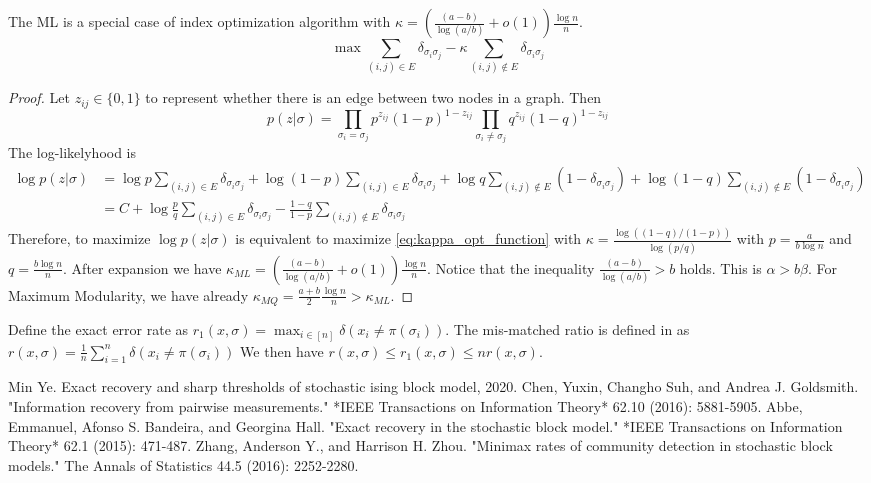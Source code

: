 \documentclass{article}
\begin{document}
\begin{proposition}
	The ML is a special case of index optimization algorithm with
	$\kappa = (\frac{(a - b)}{\log(a/b)} + o(1))\frac{\log n}{n}$.
	\begin{equation}\label{eq:kappa_opt_function}
	\max \sum_{(i,j) \in E} \delta_{\sigma_i\sigma_j} - \kappa \sum_{(i,j) \not\in E}  \delta_{\sigma_i\sigma_j} 
	\end{equation}
\end{proposition}
\begin{proof}
	Let $z_{ij} \in \{0, 1\}$ to represent whether there is an edge between two nodes in a graph. Then
	$$
	p(z | \sigma) = \prod_{\sigma_i = \sigma_j} p^{z_{ij}}
		(1-p)^{1-z_{ij}} \prod_{\sigma_i \neq \sigma_j} q^{z_{ij}}(1-q)^{1-z_{ij}}
	$$
	The log-likelyhood is
	\begin{align}
	\log p(z | \sigma) &= \log p \sum_{(i,j) \in E} \delta_{\sigma_i\sigma_j}
	+ \log(1-p) \sum_{(i,j)\in E} \delta_{\sigma_i\sigma_j} 
	+ \log q \sum_{(i,j) \not\in E} (1-\delta_{\sigma_i\sigma_j})
	+\log (1-q) \sum_{(i,j) \not\in E} (1-\delta_{\sigma_i\sigma_j}) \\
	& =C + \log\frac{p}{q} \sum_{(i,j) \in E} \delta_{\sigma_i\sigma_j}
	-\frac{1-q}{1-p}\sum_{(i,j) \not\in E} \delta_{\sigma_i\sigma_j}
	\end{align}
	Therefore, to maximize $\log p (z | \sigma)$ is equivalent to maximize \eqref{eq:kappa_opt_function}
	with $\kappa = \frac{\log((1-q)/(1-p))}{\log (p / q)}$ with $p=\frac{a}{b\log n}$ and
	$q = \frac{b\log n}{n}$. After expansion we have $\kappa_{ML} = (\frac{(a - b)}{\log(a/b)} + o(1))\frac{\log n}{n}$.
	Notice that the inequality
	$ \frac{(a - b)}{\log(a/b)}  > b$ holds. This is $\alpha > b \beta$.
	For Maximum Modularity, we have already $\kappa_{MQ} = \frac{a+b}{2}\frac{\log n}{n} > \kappa_{ML}$.
\end{proof}
\begin{proposition}
	Define the exact error rate as
	$r_1(x, \sigma) = \max_{i\in [n]} \delta(x_i \neq \pi(\sigma_i))$.
	The mis-matched ratio is defined in \cite{zhang} as
	$ r(x, \sigma) = \frac{1}{n} \sum_{i=1}^n \delta(x_i \neq \pi(\sigma_i))$
	We then have $ r(x, \sigma) \leq r_1(x, \sigma) \leq n r(x, \sigma)$.
\end{proposition}
\begin{thebibliography}{1}
	

	Min Ye.
	\newblock Exact recovery and sharp thresholds of stochastic ising block model,
	2020.
	Chen, Yuxin, Changho Suh, and Andrea J. Goldsmith. "Information recovery from pairwise measurements." *IEEE Transactions on Information Theory* 62.10 (2016): 5881-5905.
	Abbe, Emmanuel, Afonso S. Bandeira, and Georgina Hall. "Exact recovery in the stochastic block model." *IEEE Transactions on Information Theory* 62.1 (2015): 471-487.
	Zhang, Anderson Y., and Harrison H. Zhou. "Minimax rates of community detection in stochastic block models." The Annals of Statistics 44.5 (2016): 2252-2280.
\end{thebibliography}
\end{document}

